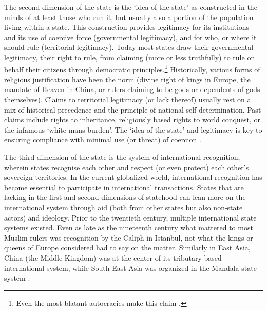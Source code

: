 The second dimension of the state is the `idea of the state' as constructed in
the minds of at least those who run it, but usually also a portion of the
population living within a state. This construction provides legitimacy for its
institutions and its use of coercive force (governmental legitimacy), and for
who, or where it should rule (territorial legitimacy). Today most states draw
their governmental legitimacy, their right to rule, from claiming (more or less
truthfully) to rule on behalf their citizens through democratic
principles.\footnote{Even the most blatant autocracies make this claim
\citep{FukuyamaFrancis2014POaP}.} Historically, various forms of religious
justification have been the norm (divine right of kings in Europe, the mandate
of Heaven in China, or rulers claiming to be gods or dependents of gods
themselves). Claims to territorial legitimacy (or lack thereof) usually rest on
a mix of historical precedence and the principle of national self determination.
Past claims include rights to inheritance, religiously based rights to world
conquest, or the infamous `white mans burden'. The `idea of the state' and
legitimacy is key to ensuring compliance with minimal use (or threat) of
coercion \citep{BuzanBarry2007PSaF}. 

The third dimension of the state is the system of international recognition,
wherein states recognise each other and respect (or even protect) each other's
sovereign territories. In the current globalized world, international
recognition has become essential to participate in international transactions.
States that are lacking in the first and second dimensions of statehood can lean
more on the international system through aid (both from other states but also
non-state actors) and ideology. Prior to the twentieth century, multiple
international state systems existed. Even as late as the nineteenth century what
mattered to most Muslim rulers was recognition by the Caliph in Istanbul, not
what the kings or queens of Europe considered had to say on the matter.
Similarly in East Asia, China (the Middle Kingdom) was at the center of its
tributary-based international system, while South East Asia was organized in the
Mandala state system \citep{Hui_2005, KangDavidC2010EAbt}.

